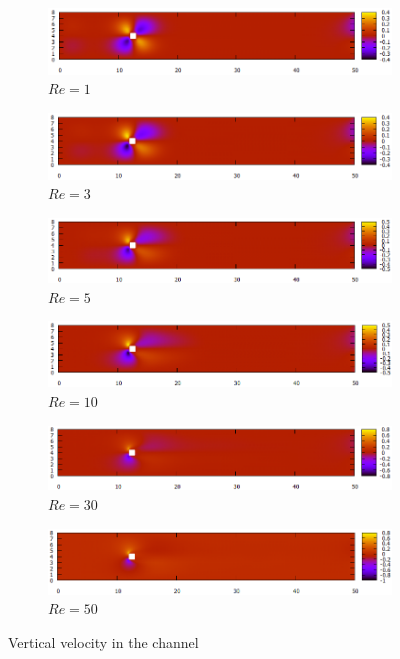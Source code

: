 \begin{figure}[h]
	\begin{subfigure}{\textwidth}
		\centering
		\includegraphics[width=.8\linewidth]{Square/totv1}
		\caption{$Re=1$}
	\end{subfigure}
	\begin{subfigure}{\textwidth}
		\centering
		\includegraphics[width=.8\linewidth]{Square/totv3}
		\caption{$Re=3$}
	\end{subfigure}
	\begin{subfigure}{\textwidth}
		\centering
		\includegraphics[width=.8\linewidth]{Square/totv5}
		\caption{$Re=5$}
	\end{subfigure}
	\begin{subfigure}{\textwidth}
		\centering
		\includegraphics[width=.8\linewidth]{Square/totv10}
		\caption{$Re=10$}
	\end{subfigure}
	\begin{subfigure}{\textwidth}
		\centering
		\includegraphics[width=.8\linewidth]{Square/totv30}
		\caption{$Re=30$}
	\end{subfigure}
	\begin{subfigure}{\textwidth}
		\centering
		\includegraphics[width=.8\linewidth]{Square/totv50}
		\caption{$Re=50$}
	\end{subfigure}
	\caption{Vertical velocity in the channel}
\end{figure}